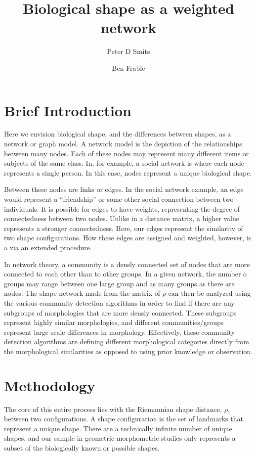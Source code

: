 \documentclass{article}\usepackage{graphicx, color}
\title{Biological shape as a weighted network}
\author{Peter D Smits \and Ben Frable}
\begin{document}
\maketitle


\section{Brief Introduction}
Here we envision biological shape, and the differences between shapes, as a network or graph model.
A network model is the depiction of the relationships between many nodes.
Each of these nodes may represent many different items or subjects of the same class.
In, for example, a social network is where each node represents a single person.
In this case, nodes represent a unique biological shape.

Between these nodes are links or edges.
In the social network example, an edge would represent a ``friendship'' or some other social connection between two individuals.
It is possible for edges to have weights, representing the degree of connectedness between two nodes.
Unlike in a distance matrix, a higher value represents a stronger connectedness.
Here, our edges represent the similarity of two shape configurations.
How these edges are assigned and weighted, however, is a via an extended procedure.

In network theory, a community is a densly connected set of nodes that are more connected to each other than to other groups.
In a given network, the number o groups may range between one large group and as many groups as there are nodes.
The shape network made from the matrix of \(\rho\) can then be analyzed using the various community detection algorithms in order to find if there are any subgroups of morphologies that are more densly connected.
These subgroups represent highly similar morphologies, and different communities/groups represent large scale differences in morphology.
Effectively, these community detection algorithms are defining different morphological categories directly from the morphological similarities as opposed to using prior knowledge or observation.


\section{Methodology}
The core of this entire process lies with the Riemannian shape distance, \(\rho\), between two configurations. 
A shape configuration is the set of landmarks that represent a unique shape. 
There are a technically infinite number of unique shapes, and our sample in geometric morphometric studies only represents a subset of the biologically known or possible shapes.
\end{document}
